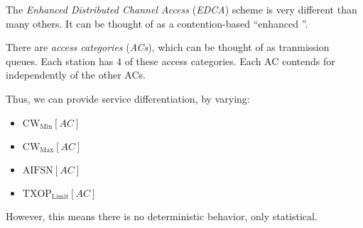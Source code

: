 \begin{definition}\label{def:EDCA}
  The \emph{Enhanced Distributed Channel Access} (\emph{EDCA}) scheme is very different than many others.
  It can be thought of as a contention-based ``enhanced ''.

  There are \emph{access categories} (\emph{ACs}), which can be thought of as tranmission queues.
  Each station has 4 of these access categories.
  Each AC contends for  independently of the other ACs.

  Thus, we can provide service differentiation, by varying:
  \begin{itemize}[noitemsep]
  \item $\mathrm{CW}_{\mathrm{Min}}[AC]$
  \item $\mathrm{CW}_{\mathrm{Max}}[AC]$
  \item $\mathrm{AIFSN}[AC]$
  \item $\mathrm{TXOP}_{\mathrm{Limit}}[AC]$
  \end{itemize}

  However, this means there is no deterministic behavior, only statistical.
\end{definition}

